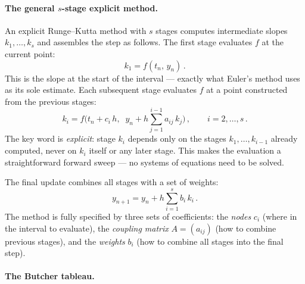 \paragraph{The general $s$-stage explicit method.}

An explicit Runge--Kutta method with $s$ stages computes intermediate
slopes $k_1, \ldots, k_s$ and assembles the step as follows.  The
first stage evaluates $f$ at the current point:
%
\begin{equation}
  k_1 = f(t_n,\, y_n) \,.
  \label{eq:rk-k1}
\end{equation}
%
This is the slope at the start of the interval --- exactly what Euler's
method uses as its sole estimate.  Each subsequent stage evaluates $f$
at a point constructed from the previous stages:
%
\begin{equation}
  k_i = f\!\biggl(t_n + c_i\,h,\;\;
    y_n + h \sum_{j=1}^{i-1} a_{ij}\,k_j\biggr) \,,
  \qquad i = 2, \ldots, s \,.
  \label{eq:rk-stages}
\end{equation}
%
The key word is \emph{explicit}: stage $k_i$ depends only on the
stages $k_1, \ldots, k_{i-1}$ already computed, never on $k_i$
itself or any later stage.  This makes the evaluation a straightforward
forward sweep --- no systems of equations need to be solved.

The final update combines all stages with a set of weights:
%
\begin{equation}
  y_{n+1} = y_n + h \sum_{i=1}^{s} b_i\,k_i \,.
  \label{eq:rk-update}
\end{equation}
%
The method is fully specified by three sets of coefficients: the
\emph{nodes} $c_i$ (where in the interval to evaluate), the
\emph{coupling matrix} $A = (a_{ij})$ (how to combine previous stages),
and the \emph{weights} $b_i$ (how to combine all stages into the final
step).

\paragraph{The Butcher tableau.}

